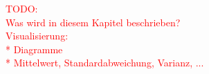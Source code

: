


















\textcolor{red}{TODO:\\
Was wird in diesem Kapitel beschrieben?\\
Visualisierung:\\
* Diagramme\\
* Mittelwert, Standardabweichung, Varianz, ...
}


